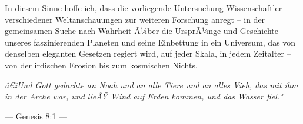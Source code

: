 ﻿\documentclass[12pt,a4paper]{report}
\begin{document}
In diesem Sinne hoffe ich, dass die vorliegende Untersuchung Wissenschaftler verschiedener Weltanschauungen zur weiteren Forschung anregt -- in der gemeinsamen Suche nach Wahrheit Ã¼ber die UrsprÃ¼nge und Geschichte unseres faszinierenden Planeten und seine Einbettung in ein Universum, das von denselben eleganten Gesetzen regiert wird, auf jeder Skala, in jedem Zeitalter -- von der irdischen Erosion bis zum kosmischen Nichts.

\begin{center}
	\vspace{0.5cm}
	
	\textit{â€žUnd Gott gedachte an Noah und an alle Tiere und an alles Vieh, das mit ihm in der Arche war, und lieÃŸ Wind auf Erden kommen, und das Wasser fiel."}
	
	\vspace{0.2cm}
	
	--- Genesis 8:1 ---
\end{center}
\end{document}
